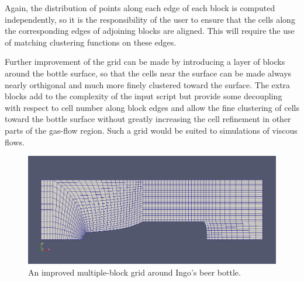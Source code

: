 \medskip
Again, the distribution of points along each edge of each block is computed independently,
so it is the responsibility of the user to ensure that the cells along the 
corresponding edges of adjoining blocks are aligned.
This will require the use of matching clustering functions on these edges.

\noindent
\topbar

\bottombar

\medskip
Further improvement of the grid can be made by introducing a layer of blocks around
the bottle surface, so that the cells near the surface can be made always nearly
orthigonal and much more finely clustered toward the surface.
The extra blocks add to the complexity of the input script but provide some decoupling 
with respect to cell number along block edges and allow the fine clustering of cells
toward the bottle surface without greatly increasing 
the cell refinement in other parts of the gas-flow region.
Such a grid would be suited to simulations of viscous flows.

\begin{figure}[htbp]
\begin{center}
\includegraphics[width=\textwidth]{../2D/beer-bottle/the_clustered_bottle.png}
\end{center}
\caption{An improved multiple-block grid around Ingo's beer bottle.}
\label{the-clustered-bottle-fig}
\end{figure}


